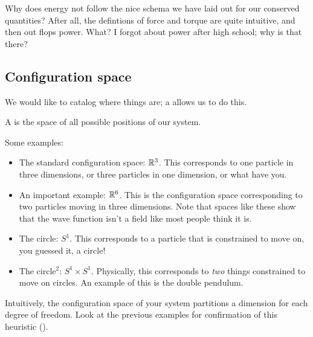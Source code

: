 \documentclass[11pt]{article}
\begin{document}
\begin{reemark}
    Why does energy not follow the nice schema we have laid
    out for our conserved quantities? After all, the defintions
    of force and torque are quite intuitive, and then out flops
    power. What? I forgot about power after high school; why is that
    there? 
\end{reemark}

\subsection{Configuration space}

We would like to catalog where things are; a 
allows us to do this.

\begin{ddefinition}
    A  is the space of all possible positions
    of our system.
\end{ddefinition}

\begin{eexample}
    Some examples:
    \begin{itemize}
        \item The standard configuration space: $\mathbb{R}^3$. This corresponds
        to one particle in three dimensions, or three particles in one dimension,
        or what have you.
        \item An important example: $\mathbb{R}^6$. This is the configuration
        space corresponding to two particles moving in three dimensions.
        Note that spaces like these show that the wave function isn't 
        a field like most people think it is.
        \item The circle: $S^1$. This corresponds to a particle that
        is constrained to move on, you guessed it, a circle!
        \item The circle$^2$: $S^1 \times S^1$. Physically, this corresponds
        to \emph{two} things constrained to move on circles. An example of this
        is the double pendulum.
    \end{itemize}
\end{eexample}

\begin{reemark}
    Intuitively, the configuration space of your system partitions
    a dimension for each degree of freedom. Look at the previous examples
    for confirmation of this heuristic ().
\end{reemark}
\end{document}
